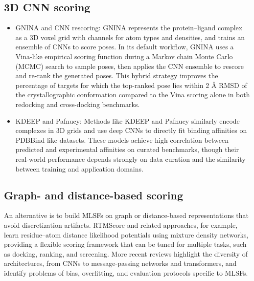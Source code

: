 \documentclass[12pt]{article}
\begin{document}
\subsection{3D CNN scoring}

\begin{itemize}
\item GNINA and CNN rescoring: GNINA represents the protein–ligand complex as a 3D voxel grid with channels for atom types and densities, and trains an ensemble of CNNs to score poses.\cite{CH13_mcnutt2021gnina} In its default workflow, GNINA uses a Vina-like empirical scoring function during a Markov chain Monte Carlo (MCMC) search to sample poses, then applies the CNN ensemble to rescore and re-rank the generated poses. This hybrid strategy improves the percentage of targets for which the top-ranked pose lies within 2 \r{A} RMSD of the crystallographic conformation compared to the Vina scoring alone in both redocking and cross-docking benchmarks.\cite{CH13_mcnutt2021gnina}

\item KDEEP and Pafnucy: Methods like KDEEP and Pafnucy similarly encode complexes in 3D grids and use deep CNNs to directly fit binding affinities on PDBBind-like datasets.\cite{CH13_meli2022dlreview,CH13_durant2025robustly} These models achieve high correlation between predicted and experimental affinities on curated benchmarks, though their real-world performance depends strongly on data curation and the similarity between training and application domains.\cite{CH13_meli2022dlreview,CH13_durant2025robustly}
\end{itemize}

\subsection{Graph- and distance-based scoring}

An alternative is to build MLSFs on graph or distance-based representations that avoid discretization artifacts. RTMScore and related approaches, for example, learn residue–atom distance likelihood potentials using mixture density networks, providing a flexible scoring framework that can be tuned for multiple tasks, such as docking, ranking, and screening.\cite{CH13_shen2023generalized} More recent reviews highlight the diversity of architectures, from CNNs to message-passing networks and transformers, and identify problems of bias, overfitting, and evaluation protocols specific to MLSFs.\cite{CH13_meli2022dlreview,CH13_durant2025robustly}
\end{document}
